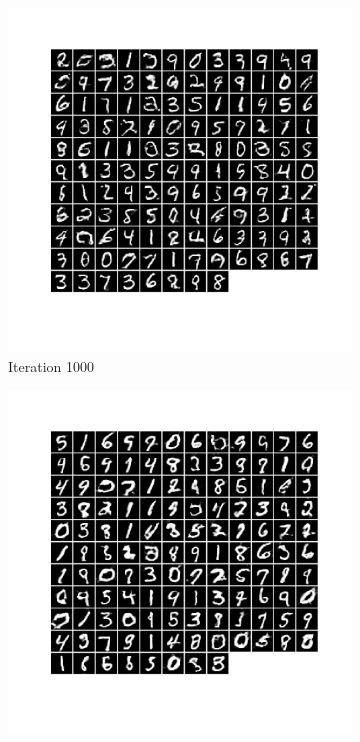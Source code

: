 \documentclass[12pt]{article}
\begin{document}
\begin{figure}[htbp]
    \centering
    \begin{subfigure}[t]{0.48\textwidth}
        \centering
        \includegraphics[trim={1in 2in 1in 0in},scale=0.3]{./Homework3/output/gan/4.png}
        \caption{Iteration 1000}
    \label{hw3p4e}
    \end{subfigure}
    \begin{subfigure}[t]{0.48\textwidth}
        \centering
        \includegraphics[trim={1in 2in 1in 0in},scale=0.3]{./Homework3/output/gan/5.png}

\end{subfigure}
\end{figure}
\end{document}
